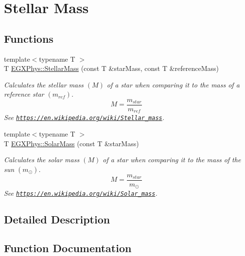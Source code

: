 \hypertarget{group___e_g_x_phys-_stellar_mass}{}\section{Stellar Mass}
\label{group___e_g_x_phys-_stellar_mass}
\subsection*{Functions}
\begin{DoxyCompactItemize}
\item 
{\footnotesize template$<$typename T $>$ }\\T \mbox{\hyperlink{group___e_g_x_phys-_stellar_mass_gabbd6081cd3bfb0153d7470d58f733a61}{E\+G\+X\+Phys\+::\+Stellar\+Mass}} (const T \&star\+Mass, const T \&reference\+Mass)
\begin{DoxyCompactList}\small\item\em Calculates the stellar mass $(M)$ of a star when comparing it to the mass of a reference star $(m_{ref})$. \[M=\frac{m_{star}}{m_{ref}}\] See \href{https://en.wikipedia.org/wiki/Stellar_mass}{\tt https\+://en.\+wikipedia.\+org/wiki/\+Stellar\+\_\+mass}. \end{DoxyCompactList}\item 
{\footnotesize template$<$typename T $>$ }\\T \mbox{\hyperlink{group___e_g_x_phys-_stellar_mass_gac393d64d586be3dc76ac7a98ac336514}{E\+G\+X\+Phys\+::\+Solar\+Mass}} (const T \&star\+Mass)
\begin{DoxyCompactList}\small\item\em Calculates the solar mass $(M)$ of a star when comparing it to the mass of the sun $(m_\odot)$. \[M=\frac{m_{star}}{m_\odot}\] See \href{https://en.wikipedia.org/wiki/Solar_mass}{\tt https\+://en.\+wikipedia.\+org/wiki/\+Solar\+\_\+mass}. \end{DoxyCompactList}\end{DoxyCompactItemize}


\subsection{Detailed Description}


\subsection{Function Documentation}
\mbox{\label{group___e_g_x_phys-_stellar_mass_gac393d64d586be3dc76ac7a98ac336514}} 
